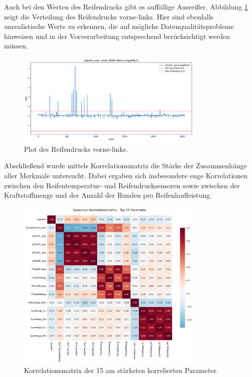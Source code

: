Auch bei den Werten des Reifendrucks gibt es auffällige Ausreißer. Abbildung \ref{fig:druck_distribution} zeigt die Verteilung des Reifendrucks vorne-links. Hier sind ebenfalls unrealistische Werte zu erkennen, die auf mögliche Datenqualitätsprobleme hinweisen und in der Vorverarbeitung entsprechend berücksichtigt werden müssen.
\begin{figure}[H]
  \centering
  \includegraphics[width=0.8\textwidth]{graphics/DruckPlot.png}
  \caption{Plot des Reifendrucks vorne-links.}
  \label{fig:druck_distribution}
\end{figure}

Abschließend wurde mittels Korrelationsmatrix die Stärke der Zusammenhänge aller Merkmale untersucht. Dabei ergaben sich insbesondere enge Korrelationen zwischen den Reifentemperatur- und Reifendrucksensoren sowie zwischen der Kraftstoffmenge und der Anzahl der Runden pro Reifenlaufleistung. 
\begin{figure}[H]
  \centering
  \includegraphics[width=0.8\textwidth]{graphics/korrelations_matrix_top.png}
  \caption{Korrelationsmatrix der 15 am stärksten korrelierten Parameter.}
  \label{fig:korrelations_matrix}
\end{figure}


